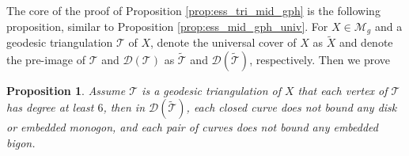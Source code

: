 \documentclass[UTF8]{amsart}
\newtheorem{proposition}[theorem]{Proposition}
\numberwithin{equation}{section}
\theoremstyle{definition}
\theoremstyle{example}
\theoremstyle{remark}
\begin{document}
The core of the proof of Proposition \ref{prop:ess_tri_mid_gph} is the following proposition, similar to Proposition \ref{prop:ess_mid_gph_univ}. For $X \in \mathcal{M}_g$ and a geodesic triangulation $\mathcal{T}$ of $X$, denote the universal cover of $X$ as $ \widetilde{X}$ and denote the pre-image of $\mathcal{T}$ and $\mathcal{D}(\mathcal{T})$ as $ \widetilde{\mathcal{T}}$ and $\mathcal{D}( \widetilde{\mathcal{T}})$, respectively. Then we prove
\begin{proposition}
	Assume $\mathcal{T}$ is a geodesic triangulation of $X$ that each vertex of $\mathcal{T}$ has degree at least $6$, then in $\mathcal{D}( \widetilde{\mathcal{T}})$, each closed curve does not bound any disk or embedded monogon, and each pair of curves does not bound any embedded bigon. 

	\label{prop:ess_tri_mid_gph_univ}
\end{proposition}
\end{document}
